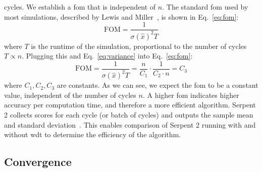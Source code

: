cycles. We establish a \gls{fom} that is independent of $n$.  The
standard \gls{fom} used by most simulations, described by Lewis and
Miller~\cite{lewis1993}, is shown in Eq.~\eqref{eq:fom}:
\begin{equation}
  \label{eq:fom}
  \mathrm{FOM} = \frac{1}{\sigma(\hat{x})^2T}
\end{equation}
where $T$ is the runtime of the simulation, proportional to the number
of cycles $T \propto n$. Plugging this and
Eq.~\eqref{eq:variance} into Eq.~\eqref{eq:fom}:
\begin{equation*}
  \mathrm{FOM} = \frac{1}{\sigma(\hat{x})^2T} =
  \frac{n}{C_1}\cdot\frac{1}{C_2\cdot n} = C_3
\end{equation*}
where $C_1,C_2,C_3$ are constants. As we can see, we expect the
\gls{fom} to be a constant value, independent of the number of cycles
$n$.  A higher \gls{fom} indicates higher accuracy per computation
time, and therefore a more efficient algorithm. Serpent 2 collects
scores for each cycle (or batch of cycles) and outputs the sample mean
and standard deviation~\cite{VTT-R-00371-14}. This enables comparison of Serpent 2
running with and without \gls{wdt} to determine the efficiency of the
algorithm.

\subsection{Convergence}
\label{sec:convergence}

